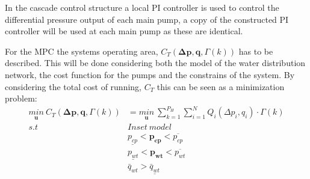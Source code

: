 

In the cascade control structure a local PI controller is used to control the differential pressure output of each main pump, a copy of the constructed PI controller will be used at each main pump as these are identical.

For the MPC the systems operating area, $C_T(\pmb{\Delta{p}},\pmb{q},\Gamma(k))$ has to be described. This will be done considering both the model of the water distribution network, the cost function for the pumps and the constrains of the system. By considering the total cost of running, $C_T$ this can be seen as a minimization problem:
\begin{align*}
\underset{\pmb{u}}{min} \: C_T(\pmb{\Delta{p}},\pmb{q},\Gamma(k)) &= \underset{\pmb{u}}{min} \: \sum_{k=1}^{P_H} \sum_{i=1}^{N} Q_i(\Delta{p}_i,q_i) \cdot \Gamma(k)  \\
%
s.t \:\:\:\:\: & Inset \:model \\
%
& \underline{p_{cp}} < \pmb{p_{cp}} < \overline{p_{cp}} \\
%
& \underline{p_{wt}} < \pmb{p_{wt}} < \overline{p_{wt}} \\
%
& \bar{q}_{wt} > \underline{\bar{q}_{wt}}
\end{align*}

